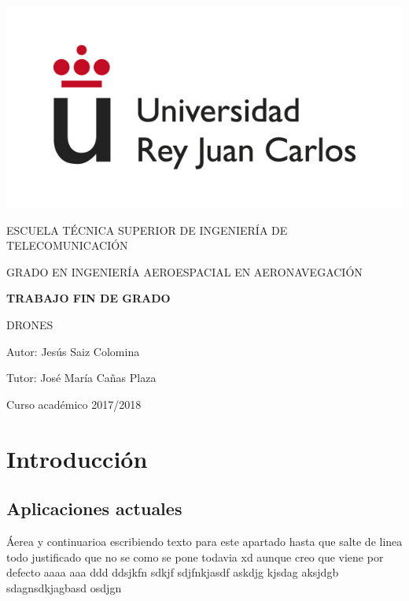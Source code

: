 \documentclass{book}
\begin{document}
\begin{titlepage}
	\begin{center}
		\vspace*{20mm}
		\begin{center}
			\includegraphics[width=0.4\linewidth]{img/logo.jpg}
		\end{center}
		\vspace{6.5mm}
		
		\fontsize{15.5}{14}\selectfont ESCUELA TÉCNICA SUPERIOR DE INGENIERÍA DE TELECOMUNICACIÓN
		\vspace{8mm}
		
		\fontsize{14}{14}\selectfont GRADO EN INGENIERÍA AEROESPACIAL EN AERONAVEGACIÓN
		
		\vspace{60pt}
		
		\fontsize{15.7}{14}\selectfont \textbf{TRABAJO FIN DE GRADO} 
		
		\vspace{20mm}
		\begin{huge}
			DRONES 
		\end{huge}
		
		\vspace{40mm}
		
		\begin{large}
			Autor: Jesús Saiz Colomina
			
			Tutor: José María Cañas Plaza
			
			\vspace{7mm}
		\end{large}
		\begin{normalsize}
			Curso académico 2017/2018		
		\end{normalsize}
		\vspace{7mm}
	\end{center}
\end{titlepage}

\tableofcontents

\chapter{Introducción}
\section{Aplicaciones actuales}
Áerea y continuarioa escribiendo texto para este apartado
hasta que salte de linea todo justificado que no se como 
se pone todavia xd aunque creo que viene por defecto aaaa 
aaa ddd ddsjkfn sdkjf sdjfnkjasdf askdjg kjsdag aksjdgb
sdagnsdkjagbasd osdjgn
\end{document}
